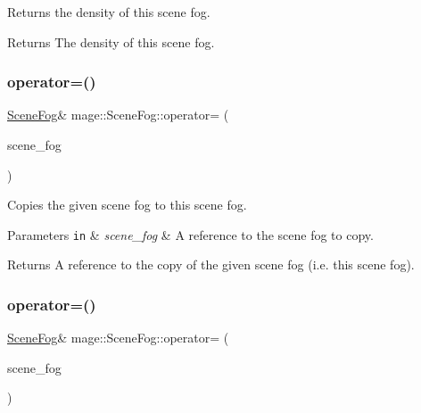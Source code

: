 Returns the density of this scene fog.

\begin{DoxyReturn}{Returns}
The density of this scene fog. 
\end{DoxyReturn}
\hypertarget{classmage_1_1_scene_fog_a2312784458fe9d8e88dcfe5c444866a4}{}\label{classmage_1_1_scene_fog_a2312784458fe9d8e88dcfe5c444866a4} 
\subsubsection{\texorpdfstring{operator=()}{operator=()}\hspace{0.1cm}{\footnotesize\ttfamily [1/2]}}
{\footnotesize\ttfamily \hyperlink{classmage_1_1_scene_fog}{Scene\+Fog}\& mage\+::\+Scene\+Fog\+::operator= (\begin{DoxyParamCaption}\item[{const \hyperlink{classmage_1_1_scene_fog}{Scene\+Fog} \&}]{scene\+\_\+fog }\end{DoxyParamCaption})\hspace{0.3cm}{\ttfamily [default]}}

Copies the given scene fog to this scene fog.


\begin{DoxyParams}[1]{Parameters}
\mbox{\tt in}  & {\em scene\+\_\+fog} & A reference to the scene fog to copy. \\
\hline
\end{DoxyParams}
\begin{DoxyReturn}{Returns}
A reference to the copy of the given scene fog (i.\+e. this scene fog). 
\end{DoxyReturn}
\hypertarget{classmage_1_1_scene_fog_af019127d949d50173c9d4af51a8dcaef}{}\label{classmage_1_1_scene_fog_af019127d949d50173c9d4af51a8dcaef} 
\subsubsection{\texorpdfstring{operator=()}{operator=()}\hspace{0.1cm}{\footnotesize\ttfamily [2/2]}}
{\footnotesize\ttfamily \hyperlink{classmage_1_1_scene_fog}{Scene\+Fog}\& mage\+::\+Scene\+Fog\+::operator= (\begin{DoxyParamCaption}\item[{\hyperlink{classmage_1_1_scene_fog}{Scene\+Fog} \&\&}]{scene\+\_\+fog }\end{DoxyParamCaption})\hspace{0.3cm}{\ttfamily [default]}}

